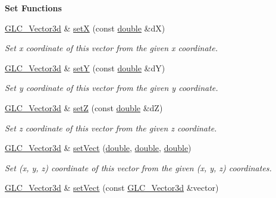 \begin{Indent}{\bf Set Functions}\par
\begin{DoxyCompactItemize}
\item 
\hyperlink{class_g_l_c___vector3d}{G\-L\-C\-\_\-\-Vector3d} \& \hyperlink{class_g_l_c___vector3d_a74f8bcdca0aaf4f5fbd21c48366f5a14}{set\-X} (const \hyperlink{_super_l_u_support_8h_a8956b2b9f49bf918deed98379d159ca7}{double} \&d\-X)
\begin{DoxyCompactList}\small\item\em Set x coordinate of this vector from the given x coordinate. \end{DoxyCompactList}\item 
\hyperlink{class_g_l_c___vector3d}{G\-L\-C\-\_\-\-Vector3d} \& \hyperlink{class_g_l_c___vector3d_a11687745d0118f342df7c509901c90da}{set\-Y} (const \hyperlink{_super_l_u_support_8h_a8956b2b9f49bf918deed98379d159ca7}{double} \&d\-Y)
\begin{DoxyCompactList}\small\item\em Set y coordinate of this vector from the given y coordinate. \end{DoxyCompactList}\item 
\hyperlink{class_g_l_c___vector3d}{G\-L\-C\-\_\-\-Vector3d} \& \hyperlink{class_g_l_c___vector3d_ae35fa71c2d4e998bd56971983b4ec3c3}{set\-Z} (const \hyperlink{_super_l_u_support_8h_a8956b2b9f49bf918deed98379d159ca7}{double} \&d\-Z)
\begin{DoxyCompactList}\small\item\em Set z coordinate of this vector from the given z coordinate. \end{DoxyCompactList}\item 
\hyperlink{class_g_l_c___vector3d}{G\-L\-C\-\_\-\-Vector3d} \& \hyperlink{class_g_l_c___vector3d_a14555ea2ce820920ea5abe5c3525b853}{set\-Vect} (\hyperlink{_super_l_u_support_8h_a8956b2b9f49bf918deed98379d159ca7}{double}, \hyperlink{_super_l_u_support_8h_a8956b2b9f49bf918deed98379d159ca7}{double}, \hyperlink{_super_l_u_support_8h_a8956b2b9f49bf918deed98379d159ca7}{double})
\begin{DoxyCompactList}\small\item\em Set (x, y, z) coordinate of this vector from the given (x, y, z) coordinates. \end{DoxyCompactList}\item 
\hyperlink{class_g_l_c___vector3d}{G\-L\-C\-\_\-\-Vector3d} \& \hyperlink{class_g_l_c___vector3d_a097d26123f9937b84673496d98f202a0}{set\-Vect} (const \hyperlink{class_g_l_c___vector3d}{G\-L\-C\-\_\-\-Vector3d} \&vector)

\end{DoxyCompactItemize}
\end{Indent}
